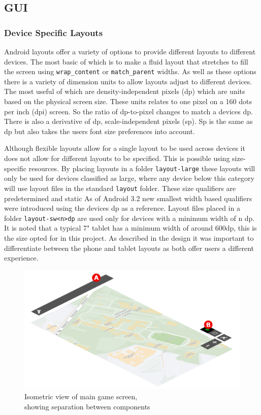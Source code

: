 \subsection{GUI}
\subsubsection*{Device Specific Layouts}
Android layouts offer a variety of options to provide different layouts to different devices. The most basic of which is to make a fluid layout that stretches to fill the screen using \verb|wrap_content| or \verb|match_parent| widths. As well as these options there is a variety of dimension units to allow layouts adjust to different devices. The most useful of which are density-independent pixels (dp) which are units based on the physical screen size. These units relates to one pixel on a 160 dots per inch (dpi) screen. So the ratio of dp-to-pixel changes to match a devices dp. There is also a derivative of dp, scale-independent pixels (sp). Sp is the same as dp but also takes the users font size preferences into account.

Although flexible layouts allow for a single layout to be used across devices it does not allow for different layouts to be specified. This is possible using size-specific resources\cite{screensizes}. By placing layouts in a folder \verb|layout-large| these layouts will only be used for devices classified as large, where any device below this category will use layout files in the standard \verb|layout| folder. These size qualifiers are predetermined and static As of Android 3.2 new smallest width based qualifiers were introduced using the devices dp as a reference. Layout files placed in a folder \verb|layout-sw<n>dp| are used only for devices with a minimum width of n dp. It is noted that a typical 7" tablet has a minimum width of around 600dp, this is the size opted for in this project. As described in the design it was important to differentiate between the phone and tablet layouts as both offer users a different experience.

\begin{figure}[H]
  \centering
   \includegraphics[width=1\textwidth]{Images/layout_include.png}
  \caption{Isometric view of main game screen,\\showing separation between components}
  \label{fig:isogui}
\end{figure}

